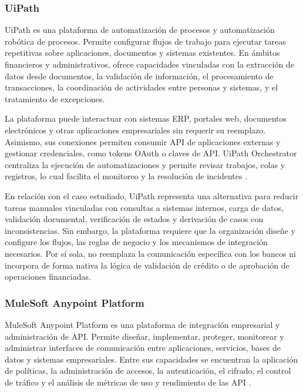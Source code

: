 \subsubsection{UiPath}

UiPath es una plataforma de automatización de procesos y automatización robótica de procesos. Permite configurar flujos de trabajo para ejecutar tareas repetitivas sobre aplicaciones, documentos y sistemas existentes. En ámbitos financieros y administrativos, ofrece capacidades vinculadas con la extracción de datos desde documentos, la validación de información, el procesamiento de transacciones, la coordinación de actividades entre personas y sistemas, y el tratamiento de excepciones.

La plataforma puede interactuar con sistemas ERP, portales web, documentos electrónicos y otras aplicaciones empresariales sin requerir su reemplazo. Asimismo, sus conexiones permiten consumir API de aplicaciones externas y gestionar credenciales, como tokens OAuth o claves de API. UiPath Orchestrator centraliza la ejecución de automatizaciones y permite revisar trabajos, colas y registros, lo cual facilita el monitoreo y la resolución de incidentes \citep{uipath}.

En relación con el caso estudiado, UiPath representa una alternativa para reducir tareas manuales vinculadas con consultas a sistemas internos, carga de datos, validación documental, verificación de estados y derivación de casos con inconsistencias. Sin embargo, la plataforma requiere que la organización diseñe y configure los flujos, las reglas de negocio y los mecanismos de integración necesarios. Por sí sola, no reemplaza la comunicación específica con los bancos ni incorpora de forma nativa la lógica de validación de crédito o de aprobación de operaciones financiadas.

\subsubsection{MuleSoft Anypoint Platform}

MuleSoft Anypoint Platform es una plataforma de integración empresarial y administración de API. Permite diseñar, implementar, proteger, monitorear y administrar interfaces de comunicación entre aplicaciones, servicios, bases de datos y sistemas empresariales. Entre sus capacidades se encuentran la aplicación de políticas, la administración de accesos, la autenticación, el cifrado, el control de tráfico y el análisis de métricas de uso y rendimiento de las API \citep{mulesoft}.

